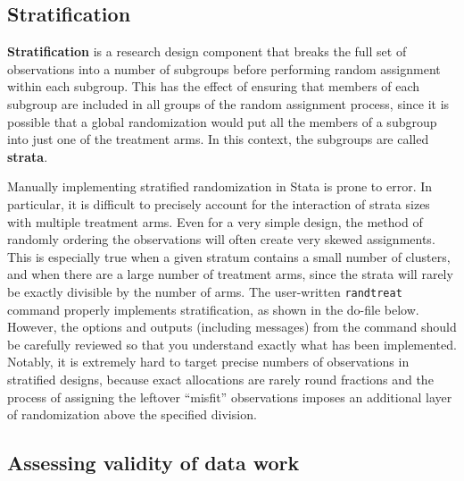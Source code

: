 \subsection{Stratification}

\textbf{Stratification} is a research design component
that breaks the full set of observations into a number of subgroups
before performing random assignment within each subgroup.
This has the effect of ensuring that members of each subgroup
are included in all groups of the random assignment process,
since it is possible that a global randomization
would put all the members of a subgroup into just one of the treatment arms.
In this context, the subgroups are called \textbf{strata}.

Manually implementing stratified randomization in Stata is prone to error.
In particular, it is difficult to precisely account
for the interaction of strata sizes with multiple treatment arms.
Even for a very simple design, the method of randomly ordering the observations
will often create very skewed assignments.
This is especially true when a given stratum contains a small number of clusters,
and when there are a large number of treatment arms,
since the strata will rarely be exactly divisible by the number of arms.\cite{carril2017dealing}
The user-written \texttt{randtreat} command properly implements stratification,
as shown in the do-file below. %
However, the options and outputs (including messages) from the command should be carefully reviewed
so that you understand exactly what has been implemented.
Notably, it is extremely hard to target precise numbers of observations
in stratified designs, because exact allocations are rarely round fractions
and the process of assigning the leftover ``misfit'' observations
imposes an additional layer of randomization above the specified division.




\subsection{Assessing validity of data work}

